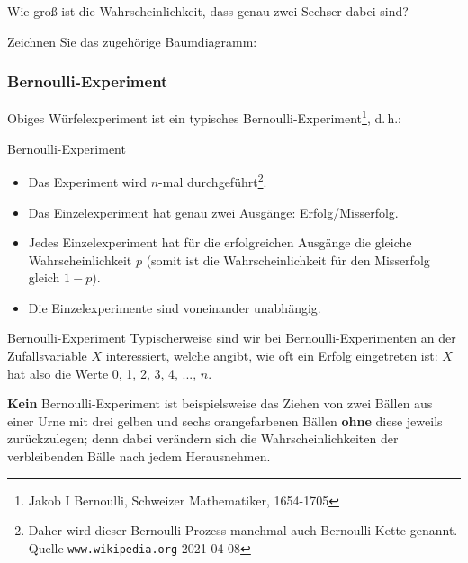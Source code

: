 Wie groß ist die Wahrscheinlichkeit, dass genau zwei Sechser dabei sind?


Zeichnen Sie das zugehörige Baumdiagramm:

\newpage


\subsubsection{Bernoulli-Experiment}
Obiges Würfelexperiment ist ein typisches
Bernoulli-Experiment\footnote{Jakob I Bernoulli, Schweizer Mathematiker,
  1654-1705}, d.\,h.:

\begin{definition}{Bernoulli-Experiment}{}
\begin{itemize}
\item Das Experiment wird $n$-mal durchgeführt\footnote{Daher wird dieser
Bernoulli-Prozess manchmal auch Bernoulli-Kette genannt. Quelle
\texttt{www.wikipedia.org} 2021-04-08}.
\item Das Einzelexperiment hat genau zwei Ausgänge: Erfolg/Misserfolg.
\item Jedes Einzelexperiment hat für die erfolgreichen Ausgänge die gleiche
      Wahrscheinlichkeit $p$ (somit ist die Wahrscheinlichkeit für den
      Misserfolg gleich $1-p$).
\item Die Einzelexperimente sind voneinander unabhängig.
\end{itemize}
\end{definition}

\begin{bemerkung}{Bernoulli-Experiment}{}
Typischerweise sind wir bei Bernoulli-Experimenten an der
Zufallsvariable $X$ interessiert, welche angibt, wie oft ein Erfolg
eingetreten ist: $X$ hat also die Werte 0, 1, 2, 3, 4, ..., $n$.
\end{bemerkung}

\textbf{Kein} Bernoulli-Experiment ist beispielsweise das Ziehen von zwei Bällen aus
einer Urne mit drei gelben und sechs orangefarbenen Bällen \textbf{ohne} diese
jeweils zurückzulegen; denn dabei verändern sich die
Wahrscheinlichkeiten der verbleibenden Bälle nach jedem Herausnehmen.
\newpage


